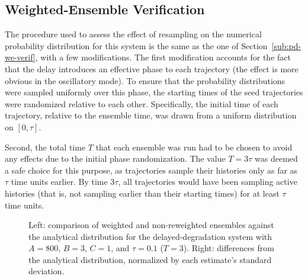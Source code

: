\documentclass[english,letterpaper,12pt]{report}
\begin{document}
\begin{doublespacing}
\subsection{Weighted-Ensemble Verification} %
\label{sub:dd-we-verif}

The procedure used to assess the effect of resampling on the numerical probability distribution for this system is the same as the one of Section~\ref{sub:pd-we-verif}, with a few modifications. The first modification accounts for the fact that the delay introduces an effective phase to each trajectory (the effect is more obvious in the oscillatory mode). To ensure that the probability distributions were sampled uniformly over this phase, the starting times of the seed trajectories were randomized relative to each other. Specifically, the initial time of each trajectory, relative to the ensemble time, was drawn from a uniform distribution on $[0, \tau]$.

Second, the total time $T$ that each ensemble was run had to be chosen to avoid any effects due to the initial phase randomization. The value $T = 3\tau$ was deemed a safe choice for this purpose, as trajectories sample their histories only as far as $\tau$ time units earlier. By time $3\tau$, all trajectories would have been sampling active histories (that is, not sampling earlier than their starting times) for at least $\tau$ time units.

\begin{figure}[t]
    \makebox[\linewidth][c]{
        \begin{subfigure}{3in}
            \begin{center}
                
            \end{center}
            \label{sfg:ddwe0-comp}
        \end{subfigure}
        \begin{subfigure}{3in}
            \begin{center}
                
            \end{center}
            \label{sfg:ddwe0-chi}
        \end{subfigure}
    }
    \caption{Left: comparison of weighted and non-reweighted ensembles against the analytical distribution for the delayed-degradation system with $A=800$, $B=3$, $C=1$, and $\tau=0.1$ ($T=3$). Right: differences from the analytical distribution, normalized by each estimate's standard deviation.}
    \label{fig:ddwe0}
\end{figure}


\end{doublespacing}
\end{document}
